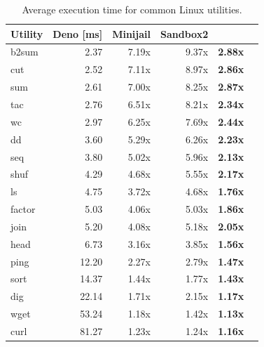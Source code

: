 \begin{table}[!t]
	\centering
    \setlength{\tabcolsep}{3mm}
	\begin{tabular*}{0.63\columnwidth}{l r r r r r}
		\toprule
		{\bf Utility} & {\bf Deno \scriptsize{[ms]}} & {\bf Minijail} & {\bf Sandbox2} & {\bf \natisand}\\
		\midrule
		b2sum   & 2.37      & 7.19x     & 9.37x & \bf{2.88x}    \\
		cut     & 2.52      & 7.11x     & 8.97x & \bf{2.86x}    \\
		sum     & 2.61      & 7.00x     & 8.25x & \bf{2.87x}    \\
		tac     & 2.76      & 6.51x     & 8.21x & \bf{2.34x}    \\
		wc      & 2.97      & 6.25x     & 7.69x & \bf{2.44x}    \\
		dd      & 3.60      & 5.29x     & 6.26x & \bf{2.23x}    \\
		seq     & 3.80      & 5.02x     & 5.96x & \bf{2.13x}    \\
		shuf    & 4.29      & 4.68x     & 5.55x & \bf{2.17x}    \\
		ls      & 4.75      & 3.72x     & 4.68x & \bf{1.76x}    \\
		factor  & 5.03      & 4.06x     & 5.03x & \bf{1.86x}    \\
		join    & 5.20      & 4.08x     & 5.18x & \bf{2.05x}    \\
		head    & 6.73      & 3.16x     & 3.85x & \bf{1.56x}    \\
		ping    & 12.20     & 2.27x     & 2.79x & \bf{1.47x}    \\
		sort    & 14.37     & 1.44x     & 1.77x & \bf{1.43x}    \\
		dig     & 22.14     & 1.71x     & 2.15x & \bf{1.17x}    \\
		wget    & 53.24     & 1.18x     & 1.42x & \bf{1.13x}    \\
		curl    & 81.27     & 1.23x     & 1.24x & \bf{1.16x}    \\
		\bottomrule
	\end{tabular*}
	\caption{\label{table:common-linux-utils} Average execution time
	  for common Linux utilities.}
\end{table}
%
